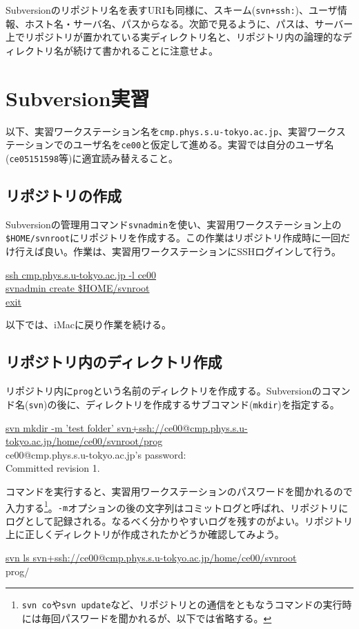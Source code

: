 Subversionのリポジトリ名を表すURIも同様に、スキーム({\tt svn+ssh:})、ユーザ情報、ホスト名・サーバ名、パスからなる。次節で見るように、パスは、サーバー上でリポジトリが置かれている実ディレクトリ名と、リポジトリ内の論理的なディレクトリ名が続けて書かれることに注意せよ。

\section{Subversion実習}

以下、実習ワークステーション名を{\tt cmp.phys.s.u-tokyo.ac.jp}、実習ワークステーションでのユーザ名を{\tt ce00}と仮定して進める。実習では自分のユーザ名({\tt ce05151598}等)に適宜読み替えること。

\subsection{リポジトリの作成}

Subversionの管理用コマンド{\tt svnadmin}を使い、実習用ワークステーション上の{\tt \$HOME/svnroot}にリポジトリを作成する。この作業はリポジトリ作成時に一回だけ行えば良い。作業は、実習用ワークステーションにSSHログインして行う。
\begin{commandline2}
\prompt \underline{ssh cmp.phys.s.u-tokyo.ac.jp -l ce00} \\
\prompt \underline{svnadmin create \$HOME/svnroot} \\
\prompt \underline{exit}
\end{commandline2} \noindent

以下では、iMacに戻り作業を続ける。

\subsection{リポジトリ内のディレクトリ作成}

リポジトリ内に{\tt prog}という名前のディレクトリを作成する。Subversionのコマンド名({\tt svn})の後に、ディレクトリを作成するサブコマンド({\tt mkdir})を指定する。
\begin{commandline2}
{\small \prompt \underline{svn mkdir -m 'test folder' svn+ssh://ce00@cmp.phys.s.u-tokyo.ac.jp/home/ce00/svnroot/prog}} \\
ce00@cmp.phys.s.u-tokyo.ac.jp's password: \\
Committed revision 1.
\end{commandline2} \noindent
コマンドを実行すると、実習用ワークステーションのパスワードを聞かれるので入力する\footnote{{\tt svn co}や{\tt svn update}など、リポジトリとの通信をともなうコマンドの実行時には毎回パスワードを聞かれるが、以下では省略する。}。{\tt -m}オプションの後の文字列はコミットログと呼ばれ、リポジトリにログとして記録される。なるべく分かりやすいログを残すのがよい。リポジトリ上に正しくディレクトリが作成されたかどうか確認してみよう。
\begin{commandline2}
\prompt \underline{svn ls svn+ssh://ce00@cmp.phys.s.u-tokyo.ac.jp/home/ce00/svnroot} \\
prog/
\end{commandline2} \noindent


